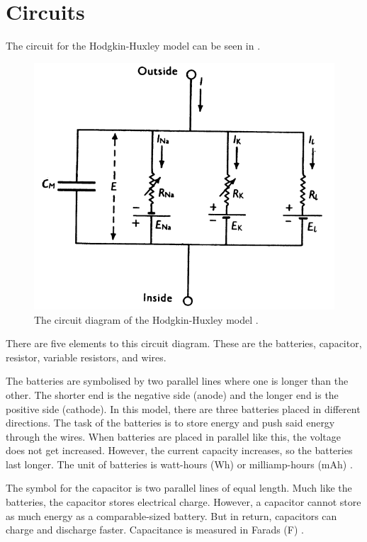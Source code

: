 \documentclass[Orator]{subfiles}
\begin{document}
 
 

\section{Circuits}
The circuit for the Hodgkin-Huxley model can be seen in . 

\begin{figure}[h]
    \centering
    \includegraphics[width=300 pt]{Pictures/Alex/Hodgkin-Huxley model 2.png}
    \caption{The circuit diagram of the Hodgkin-Huxley model \cite{}.}
    \label{fig:HH circuit}
\end{figure}

There are five elements to this circuit diagram. These are the batteries, capacitor, resistor, variable resistors, and wires. 

The batteries are symbolised by two parallel lines where one is longer than the other. The shorter end is the negative side (anode) and the longer end is the positive side (cathode). In this model, there are three batteries placed in different directions. The task of the batteries is to store energy and push said energy through the wires. When batteries are placed in parallel like this, the voltage does not get increased. However, the current capacity increases, so the batteries last longer. The unit of batteries is watt-hours (Wh) or milliamp-hours (mAh) \cite{}. 

The symbol for the capacitor is two parallel lines of equal length. Much like the batteries, the capacitor stores electrical charge. However, a capacitor cannot store as much energy as a comparable-sized battery. But in return, capacitors can charge and discharge faster. Capacitance is measured in Farads (\unit{\farad}) \cite{}.
\end{document}
